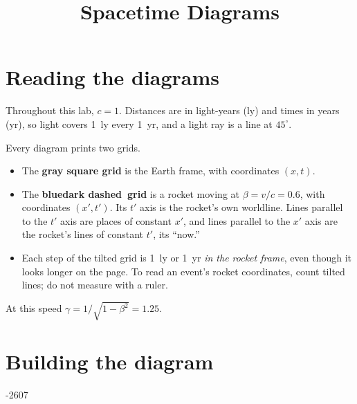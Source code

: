 \documentclass{handout}
\title{Spacetime Diagrams}
\begin{document}
\maketitle

\section*{Reading the diagrams}

Throughout this lab, $c=1$. Distances are in light-years (ly) and times in
years (yr), so light covers 1~ly every 1~yr, and a light ray is a line at
$45^\circ$.

Every diagram prints two grids.
\begin{itemize}[nosep]
  \item The \textbf{gray square grid} is the Earth frame, with coordinates $(x,t)$.
  \item The \textbf{\ifdefined\spacetimecolor blue\else dark dashed\fi\ grid} is a
        rocket moving at $\beta = v/c = 0.6$, with coordinates $(x',t')$. Its
        $t'$ axis is the rocket's own worldline. Lines parallel to the $t'$ axis
        are places of constant $x'$, and lines parallel to the $x'$ axis are the
        rocket's lines of constant $t'$, its ``now.''
  \item Each step of the tilted grid is 1~ly or 1~yr \emph{in the rocket
        frame}, even though it looks longer on the page. To read an event's
        rocket coordinates, count tilted lines; do not measure with a ruler.
\end{itemize}
At this speed $\gamma = 1/\sqrt{1-\beta^2} = 1.25$.

\section{Building the diagram}

\begin{center}
\begin{spacetime}[0.8]{-2}{6}{0}{7}
\end{spacetime}
\end{center}
\end{document}
